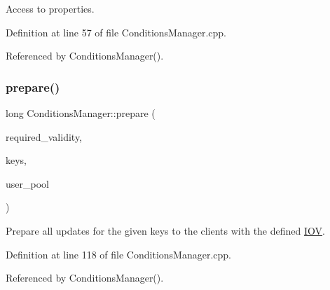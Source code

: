 Access to properties. 



Definition at line 57 of file Conditions\+Manager.\+cpp.



Referenced by Conditions\+Manager().

\hypertarget{class_d_d4hep_1_1_conditions_1_1_conditions_manager_a3f702bb3db03a4e7b947e8ed591f138b}{}\label{class_d_d4hep_1_1_conditions_1_1_conditions_manager_a3f702bb3db03a4e7b947e8ed591f138b} 
\subsubsection{\texorpdfstring{prepare()}{prepare()}\hspace{0.1cm}{\footnotesize\ttfamily [1/4]}}
{\footnotesize\ttfamily long Conditions\+Manager\+::prepare (\begin{DoxyParamCaption}\item[{const \hyperlink{class_d_d4hep_1_1_i_o_v}{I\+OV} \&}]{required\+\_\+validity,  }\item[{const \hyperlink{class_d_d4hep_1_1_conditions_1_1_conditions_manager_a8dd76f9acef2c8d3b7970e266fe7eff6}{Condition\+Keys} \&}]{keys,  }\item[{\hyperlink{class_d_d4hep_1_1dd4hep__ptr}{dd4hep\+\_\+ptr}$<$ \hyperlink{class_d_d4hep_1_1_conditions_1_1_user_pool}{User\+Pool} $>$ \&}]{user\+\_\+pool }\end{DoxyParamCaption})}



Prepare all updates for the given keys to the clients with the defined \hyperlink{class_d_d4hep_1_1_i_o_v}{I\+OV}. 



Definition at line 118 of file Conditions\+Manager.\+cpp.



Referenced by Conditions\+Manager().

\hypertarget{class_d_d4hep_1_1_conditions_1_1_conditions_manager_a8b8e72ff8060db98ecbd19a6a05eafa6}{}\label{class_d_d4hep_1_1_conditions_1_1_conditions_manager_a8b8e72ff8060db98ecbd19a6a05eafa6} 
